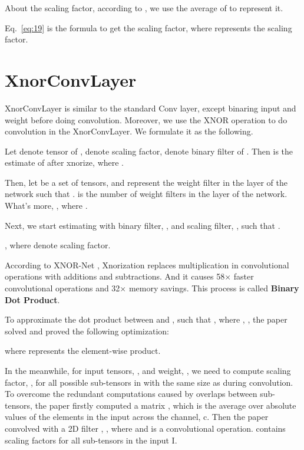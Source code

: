 \documentclass[sn-mathphys,iicol,Numbered]{sn-jnl}
\begin{document}
\begin{appendices}
About the scaling factor, according to \cite{A2_xnor}, we use the average of  to represent it.
\vspace{-0.2cm}

\vspace{-0.3cm}

Eq.~\ref{eq:19} is the formula to get the scaling factor, where  represents the scaling factor. 

\section{XnorConvLayer}
\label{appendix:B}

XnorConvLayer is similar to the standard Conv layer, except binaring input and weight before doing convolution. Moreover, we use the XNOR operation to do convolution in the XnorConvLayer. We formulate it as the following.

Let  denote  tensor of ,  denote  scaling factor,  denote binary filter of . Then  is the estimate of  after xnorize, where . 

Then, let  be a set of tensors, and  represent the  weight filter in the  layer of the network such that .  is the number of weight filters in the  layer of the network. What's more, , where . 

Next, we start estimating  with binary filter, , and scaling filter, , such that .

, where  denote  scaling factor.

According to XNOR-Net \citep{A2_xnor}, Xnorization replaces multiplication in convolutional operations with additions and subtractions. And it causes 58× faster convolutional operations and 32× memory savings. This process is called \textbf{Binary Dot Product}.

To approximate the dot product between  and , such that , where  , , the paper solved and proved the following optimization:
\vspace{-0.2cm}

where  represents the element-wise product.

In the meanwhile, for input tensors, , and weight, , we need to compute scaling factor, , for all possible sub-tensors in  with the same size as  during convolution. To overcome the redundant computations caused by overlaps between sub-tensors, the paper firstly computed a matrix , which is the average over absolute values of the elements in the input  across the channel, c. Then the paper convolved  with a 2D filter , , where  and  is a convolutional operation.  contains scaling factors  for all sub-tensors in the input I.


\end{appendices}
\end{document}
